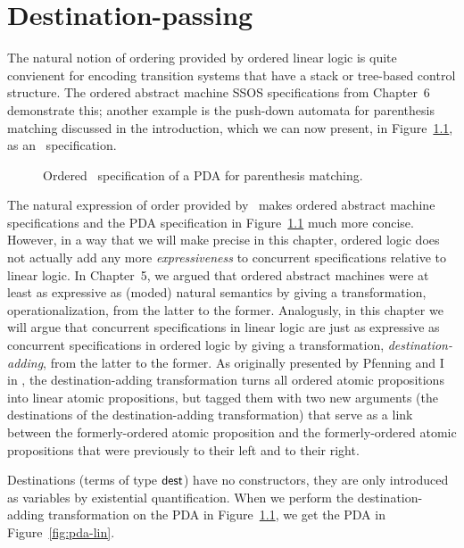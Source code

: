 \chapter{Destination-passing}
\label{chapter-destinations}

The natural notion of ordering provided by ordered linear logic
is quite convienent for encoding transition systems that 
have a stack or tree-based control structure. The ordered
abstract machine SSOS specifications from Chapter~6 demonstrate
this; another example is the push-down automata for parenthesis
matching discussed in the introduction, which we can now present,
in Figure~\ref{fig:pda-ord}, as an \sls~specification.

\begin{figure}[ht]
\caption{Ordered \sls~specification of a PDA for parenthesis matching.}
\label{fig:pda-ord}
\end{figure}

The natural expression of order provided by \sls~makes ordered
abstract machine specifications and the PDA specification in
Figure~\ref{fig:pda-ord} much more concise. However, in a way that we
will make precise in this chapter, ordered logic does not actually add
any more {\it expressiveness} to concurrent specifications relative to
linear logic. In Chapter~5, we argued that ordered abstract machines
were at least as expressive as (moded) natural semantics by giving a
transformation, operationalization, from the latter to the
former. Analogusly, in this chapter we will argue that concurrent
specifications in linear logic are just as expressive as concurrent
specifications in ordered logic by giving a transformation, {\it
  destination-adding}, from the latter to the former.  As 
originally presented by Pfenning and I in \cite{simmons11logical}, 
the destination-adding transformation turns all ordered
atomic propositions into linear atomic propositions, but tagged them
with two new arguments (the destinations of the destination-adding
transformation) that serve as a link between the formerly-ordered
atomic proposition and the formerly-ordered atomic propositions that
were previously to their left and to their right. 

Destinations (terms of type ${\sf dest}$) have no constructors, they
are only introduced as variables by existential quantification.  When
we perform the destination-adding transformation on the PDA in
Figure~\ref{fig:pda-ord}, we get the PDA in Figure~\ref{fig:pda-lin}.


